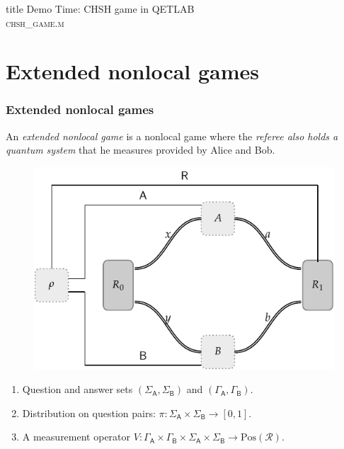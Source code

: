 \documentclass{beamer}
\def\R{\mathcal{R}}
\def \GammaA{\Gamma_{\reg{A}}}
\def \GammaB{\Gamma_{\reg{B}}}
\def \SigmaA{\Sigma_{\reg{A}}}
\def \SigmaB{\Sigma_{\reg{B}}}
\newcommand{\setft}[1]{\mathrm{#1}}
\newcommand{\Pos}{\setft{Pos}}
\newcommand{\reg}[1]{\mathsf{#1}}
\begin{document}
\begin{frame} [noframenumbering]
  \vfill
  \centering
  \begin{beamercolorbox}[sep=8pt,center,shadow=true,rounded=true]{title}
    Demo Time: CHSH game in QETLAB \\ \textsc{chsh\_game.m}
  \end{beamercolorbox}
  \vfill
\end{frame}
    

  \section{Extended nonlocal games}

\begin{frame}
	\frametitle{Extended nonlocal games}
	An \emph{extended nonlocal game} is a nonlocal game where the \emph{referee also holds a quantum system} that he measures provided by Alice and Bob. 
	\begin{figure}[!htpb] \label{fig:extended-nonlocal-game}
	\begin{center}
		\includegraphics[scale=0.7]{figures/enlg_2.pdf}
	\end{center}
\end{figure}
	\begin{enumerate}
		\item Question and answer sets $(\SigmaA,\SigmaB)$ and $(\GammaA,\GammaB)$. \vspace{1mm}		
		\item Distribution on question pairs: $\pi: \SigmaA \times \SigmaB \rightarrow [0,1]$.\vspace{1mm}
		\item A measurement operator $V: \GammaA \times \GammaB \times \SigmaA \times \SigmaB \rightarrow \Pos(\R)$.
	\end{enumerate}
\end{frame}
\end{document}
